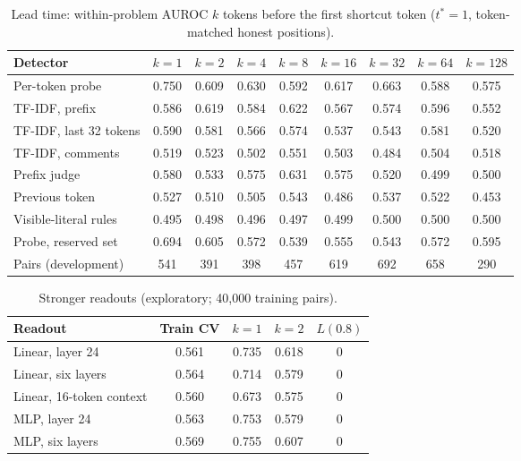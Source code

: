 \documentclass[10pt]{article}
\begin{document}
\begin{table}[ht]
\centering\footnotesize
\caption{Lead time: within-problem AUROC $k$ tokens before the first shortcut token ($t^*=1$, token-matched honest positions).}
\label{tab:app-lead}
\vspace{6pt}
\begin{tabular}{lcccccccc}
\toprule
Detector & $k=1$ & $k=2$ & $k=4$ & $k=8$ & $k=16$ & $k=32$ & $k=64$ & $k=128$ \\
\midrule
Per-token probe & 0.750 & 0.609 & 0.630 & 0.592 & 0.617 & 0.663 & 0.588 & 0.575 \\
TF-IDF, prefix & 0.586 & 0.619 & 0.584 & 0.622 & 0.567 & 0.574 & 0.596 & 0.552 \\
TF-IDF, last 32 tokens & 0.590 & 0.581 & 0.566 & 0.574 & 0.537 & 0.543 & 0.581 & 0.520 \\
TF-IDF, comments & 0.519 & 0.523 & 0.502 & 0.551 & 0.503 & 0.484 & 0.504 & 0.518 \\
Prefix judge & 0.580 & 0.533 & 0.575 & 0.631 & 0.575 & 0.520 & 0.499 & 0.500 \\
Previous token & 0.527 & 0.510 & 0.505 & 0.543 & 0.486 & 0.537 & 0.522 & 0.453 \\
Visible-literal rules & 0.495 & 0.498 & 0.496 & 0.497 & 0.499 & 0.500 & 0.500 & 0.500 \\
\midrule
Probe, reserved set & 0.694 & 0.605 & 0.572 & 0.539 & 0.555 & 0.543 & 0.572 & 0.595 \\
Pairs (development) & 541 & 391 & 398 & 457 & 619 & 692 & 658 & 290 \\
\bottomrule
\end{tabular}
\end{table}

\begin{table}[ht]
\centering\small
\caption{Stronger readouts (exploratory; 40,000 training pairs).}
\label{tab:app-strong}
\vspace{6pt}
\begin{tabular}{lcccc}
\toprule
Readout & Train CV & $k=1$ & $k=2$ & $L(0.8)$ \\
\midrule
Linear, layer 24 & 0.561 & 0.735 & 0.618 & 0 \\
Linear, six layers & 0.564 & 0.714 & 0.579 & 0 \\
Linear, 16-token context & 0.560 & 0.673 & 0.575 & 0 \\
MLP, layer 24 & 0.563 & 0.753 & 0.579 & 0 \\
MLP, six layers & 0.569 & 0.755 & 0.607 & 0 \\
\bottomrule
\end{tabular}
\end{table}
\end{document}
